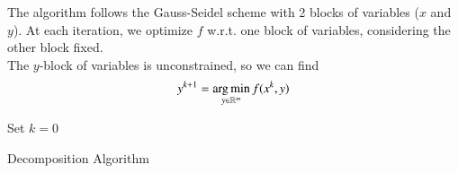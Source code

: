 The algorithm follows the Gauss-Seidel scheme with 2 blocks of variables ($x$ and $y$). At each iteration, we optimize $f$ w.r.t. one block of variables, considering the other block fixed. \\
The $y$-block of variables is unconstrained, so we can find
\begin{equation}\label{eq:updatey}
y^{k+1} = \operatorname*{arg\,min}_{y \in \mathbb{R}^m} f(x^{k},y)
\end{equation}

\begin{algorithm}[ht]
 Set $k = 0$\\
 \caption{Decomposition Algorithm}
\end{algorithm}
